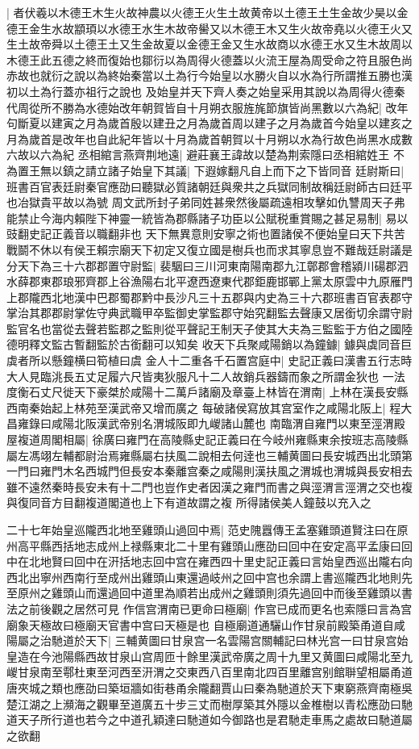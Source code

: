 |{
	者伏羲以木德王木生火故神農以火德王火生土故黄帝以土德王土生金故少昊以金德王金生水故顓頊以水德王水生木故帝嚳又以木德王木又生火故帝堯以火德王火又生土故帝舜以土德王土又生金故夏以金德王金又生水故商以水德王水又生木故周以木德王此五德之終而復始也鄒衍以為周得火德蓋以火流王屋為周受命之符且服色尚赤故也就衍之說以為終始秦當以土為行今始皇以水勝火自以水為行所謂推五勝也漢初以土為行蓋亦祖行之說也}
及始皇并天下齊人奏之始皇采用其說以為周得火德秦代周從所不勝為水德始改年朝賀皆自十月朔衣服旌旄節旗皆尚黑數以六為紀|{
	改年句斷夏以建寅之月為歲首殷以建丑之月為歲首周以建子之月為歲首今始皇以建亥之月為歲首是改年也自此紀年皆以十月為歲首朝賀以十月朔以水為行故色尚黑水成數六故以六為紀}
丞相綰言燕齊荆地遠|{
	避莊襄王諱故以楚為荆索隱曰丞相綰姓王}
不為置王無以鎮之請立諸子始皇下其議|{
	下遐嫁翻凡自上而下之下皆同音}
廷尉斯曰|{
	班書百官表廷尉秦官應劭曰聽獄必質諸朝廷與衆共之兵獄同制故稱廷尉師古曰廷平也冶獄貴平故以為號}
周文武所封子弟同姓甚衆然後屬疏遠相攻擊如仇讐周天子弗能禁止今海内賴陛下神靈一統皆為郡縣諸子功臣以公賦税重賞賜之甚足易制|{
	易以豉翻史記正義音以職翻非也}
天下無異意則安寧之術也置諸侯不便始皇曰天下共苦戰鬬不休以有侯王賴宗廟天下初定又復立國是樹兵也而求其寧息豈不難哉廷尉議是分天下為三十六郡郡置守尉監|{
	裴駰曰三川河東南陽南郡九江鄣郡會稽潁川碭郡泗水薛郡東郡琅邪齊郡上谷漁陽右北平遼西遼東代郡鉅鹿邯鄲上黨太原雲中九原雁門上郡隴西北地漢中巴郡蜀郡黔中長沙凡三十五郡與内史為三十六郡班書百官表郡守掌治其郡郡尉掌佐守典武職甲卒監御史掌監郡守始究翻監去聲康又居銜切余謂守尉監官名也當從去聲若監郡之監則從平聲記王制天子使其大夫為三監監于方伯之國陸德明釋文監古暫翻監於古銜翻可以知矣}
收天下兵聚咸陽銷以為鐘鐻|{
	鐻與虡同音巨虡者所以懸鐘横曰筍植曰虞}
金人十二重各千石置宫庭中|{
	史記正義曰漢書五行志時大人見臨洮長五丈足履六尺皆夷狄服凡十二人故銷兵器鑄而象之所謂金狄也}
一法度衡石丈尺徙天下豪桀於咸陽十二萬戶諸廟及章臺上林皆在渭南|{
	上林在漢長安縣西南秦始起上林苑至漢武帝又增而廣之}
每破諸侯寫放其宫室作之咸陽北阪上|{
	程大昌雍錄曰咸陽北阪漢武帝别名渭城阪即九嵕諸山麓也}
南臨渭自雍門以東至涇渭殿屋複道周閣相屬|{
	徐廣曰雍門在高陵縣史記正義曰在今岐州雍縣東余按班志高陵縣屬左馮翊左輔都尉治焉雍縣屬右扶風二說相去何逹也三輔黄圖曰長安城西出北頭第一門曰雍門木名西城門但長安本秦離宫秦之咸陽則漢扶風之渭城也渭城與長安相去雖不遠然秦時長安未有十二門也豈作史者因漢之雍門而書之與涇渭言涇渭之交也複與復同音方目翻複道閣道也上下有道故謂之複}
所得諸侯美人鐘鼓以充入之

二十七年始皇巡隴西北地至雞頭山過回中焉|{
	范史隗囂傳王孟塞雞頭道賢注曰在原州高平縣西括地志成州上禄縣東北二十里有雞頭山應劭曰回中在安定高平孟康曰回中在北地賢曰回中在汧括地志回中宫在雍西四十里史記正義曰言始皇西巡出隴右向西北出寧州西南行至成州出雞頭山東還過岐州之回中宫也余謂上書巡隴西北地則先至原州之雞頭山而還過回中道里為順若出成州之雞頭則須先過回中而後至雞頭以書法之前後觀之居然可見}
作信宫渭南已更命曰極廟|{
	作宫已成而更名也索隱曰言為宫廟象天極故曰極廟天官書中宫曰天極是也}
自極廟道通驪山作甘泉前殿築甬道自咸陽屬之治馳道於天下|{
	三輔黄圖曰甘泉宫一名雲陽宫關輔記曰林光宫一曰甘泉宫始皇造在今池陽縣西故甘泉山宫周匝十餘里漢武帝廣之周十九里又黄圖曰咸陽北至九嵕甘泉南至鄠杜東至河西至汧渭之交東西八百里南北四百里離宫别館聨望相屬甬道唐夾城之類也應劭曰築垣牆如街巷甬余隴翻賈山曰秦為馳道於天下東窮燕齊南極吳楚江湖之上瀕海之觀畢至道廣五十步三丈而樹厚築其外隱以金椎樹以青松應劭曰馳道天子所行道也若今之中道孔穎達曰馳道如今御路也是君馳走車馬之處故曰馳道屬之欲翻}


